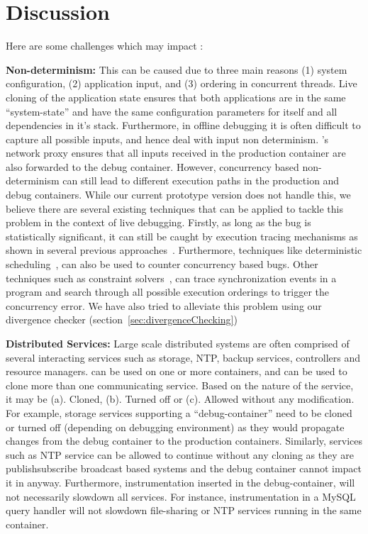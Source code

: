 \vspace{-2mm}
\section{Discussion}
\label{sec:threats}
\noindent
Here are some challenges which may impact \parikshan:

\noindent
\textbf{Non-determinism:} This can be caused due to three main reasons (1) system configuration, (2) application input, and (3) ordering in concurrent threads.
Live cloning of the application state ensures that both applications are in the same ``system-state'' and have the same configuration parameters for itself and all dependencies in it's stack.
Furthermore, in offline debugging it is often difficult to capture all possible inputs, and hence deal with input non determinism.
\parikshan's network proxy ensures that all inputs received in the production container are also forwarded to the debug container.
However, concurrency based non-determinism can still lead to different execution paths in the production and debug containers.
While our current prototype version does not handle this, we believe there are several existing techniques that can be applied to tackle this problem in the context of live debugging. 
Firstly, as long as the bug is statistically significant, it can still be caught by execution tracing mechanisms as shown in several previous approaches~\cite{Liblit:2004:CBI}.
Furthermore, techniques like deterministic scheduling~\cite{smt:cacm}, can also be used to counter concurrency based bugs.
Other techniques such as constraint solvers~\cite{dpor, best}, can trace synchronization events in a program and search through all possible execution orderings to trigger the concurrency error.
We have also tried to alleviate this problem using our divergence checker (section~\ref{sec:divergenceChecking})

\textbf{Distributed Services:} Large scale distributed systems are often comprised of several interacting services such as storage, NTP, backup services, controllers and resource managers.
\parikshan can be used on one or more containers, and can be used to clone more than one communicating service.
Based on the nature of the service, it may be (a). Cloned, (b). Turned off or (c). Allowed without any modification.
For example, storage services supporting a ``debug-container'' need to be cloned or turned off (depending on debugging environment) as they would propagate changes from the debug container to the production containers.
Similarly, services such as NTP service can be allowed to continue without any cloning as they are publish\/subscribe broadcast based systems and the debug container cannot impact it in anyway.
Furthermore, instrumentation inserted in the debug-container, will not necessarily slowdown all services.
For instance, instrumentation in a MySQL query handler will not slowdown file-sharing or NTP services running in the same container.

